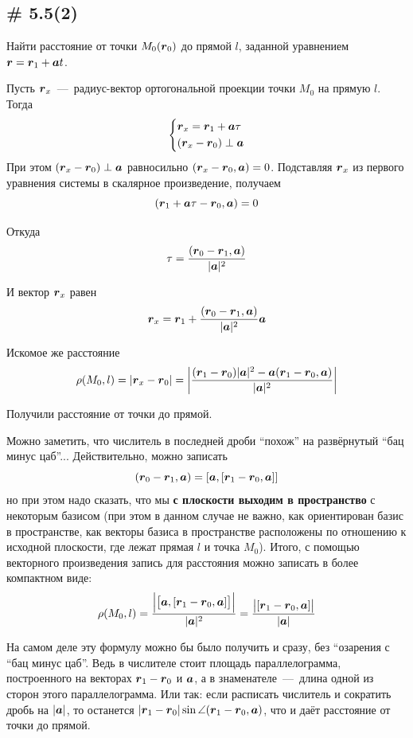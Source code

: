 \documentclass[a4paper,12pt]{article}
\begin{document}
  
  \subsection{\# 5.5(2)}
  
  \begin{problem}
    Найти расстояние от точки $M_0(\boldsymbol r_0)$ до прямой $l$, заданной уравнением $\bds r \hm= \bds r_1 \hm+ \bds a t$.
  \end{problem}
  
  \begin{solution}
    Пусть $\boldsymbol r_x$~---~радиус-вектор ортогональной проекции точки $M_0$ на прямую $l$.
    Тогда
    \[
      \left\{
        \begin{aligned}
          &\boldsymbol r_x = \boldsymbol r_1 + \boldsymbol a \tau\\
          &(\boldsymbol r_x - \boldsymbol r_0) \perp \boldsymbol a
        \end{aligned}
      \right.
    \]
    При этом $(\bds r_x \hm- \bds r_0) \hm\perp \bds a$ равносильно $(\bds r_x \hm- \bds r_0, \bds a) \hm= 0$.
    Подставляя $\boldsymbol r_x$ из первого уравнения системы в скалярное произведение, получаем
    \[
      (\boldsymbol r_1 + \boldsymbol a \tau - \boldsymbol r_0, \boldsymbol a) = 0
    \]
    
    Откуда
    \[
      \tau = \frac{(\boldsymbol r_0 - \boldsymbol r_1, \boldsymbol a)}{|\boldsymbol a|^2}
    \]
    
    И вектор $\boldsymbol r_x$ равен
    \[
      \boldsymbol r_x = \boldsymbol r_1 + \frac{(\boldsymbol r_0 - \boldsymbol r_1, \boldsymbol a)}{|\boldsymbol a|^2} \boldsymbol a
    \]
    
    Искомое же расстояние
    \[
      \rho(M_0, l) = |\boldsymbol r_x - \boldsymbol r_0|
      = \left|\frac{(\boldsymbol r_1 - \boldsymbol r_0)|\boldsymbol a|^2 - \boldsymbol a (\boldsymbol r_1 - \boldsymbol r_0, \boldsymbol a)}{|\boldsymbol a|^2}\right|
    \]
    
    Получили расстояние от точки до прямой.
    
    Можно заметить, что числитель в последней дроби ``похож'' на развёрнутый ``бац минус цаб''...
    Действительно, можно записать
    \[
      (\boldsymbol r_0 - \boldsymbol r_1, \boldsymbol a) = [\boldsymbol a, [\boldsymbol r_1 - \boldsymbol r_0, \boldsymbol a]]
    \]
    но при этом надо сказать, что мы \textbf{с плоскости выходим в пространство} с некоторым базисом (при этом в данном случае не важно, как ориентирован базис в пространстве, как векторы базиса в пространстве расположены по отношению к исходной плоскости, где лежат прямая $l$ и точка $M_0$).
    Итого, с помощью векторного произведения запись для расстояния можно записать в более компактном виде:
    \[
      \rho(M_0, l) = \frac{\Bigl|\bigl[\boldsymbol a, [\boldsymbol r_1 - \boldsymbol r_0, \boldsymbol a]\bigr]\Bigr|}{|\boldsymbol a|^2}
      = \frac{\bigl|[\boldsymbol r_1 - \boldsymbol r_0, \boldsymbol a]\bigr|}{|\boldsymbol a|}
    \]
    
    На самом деле эту формулу можно бы было получить и сразу, без ``озарения с ``бац минус цаб''.
    Ведь в числителе стоит площадь параллелограмма, построенного на векторах $\bds r_1 \hm- \bds r_0$ и $\boldsymbol a$, а в знаменателе~---~длина одной из сторон этого параллелограмма.
    Или так: если расписать числитель и сократить дробь на $|\boldsymbol a|$, то останется $|\bds r_1 \hm- \bds r_0| \sin \angle(\bds r_1 \hm- \bds r_0, \bds a)$, что и даёт расстояние от точки до прямой.
  \end{solution}
  
\end{document}
